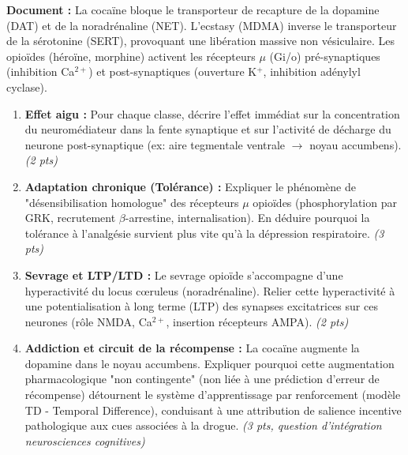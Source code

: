 \documentclass[11pt]{article}
\begin{document}
\begin{exercice}
\textbf{Document :} La cocaïne bloque le transporteur de recapture de la dopamine (DAT) et de la noradrénaline (NET). L'ecstasy (MDMA) inverse le transporteur de la sérotonine (SERT), provoquant une libération massive non vésiculaire. Les opioïdes (héroïne, morphine) activent les récepteurs $\mu$ (Gi/o) pré-synaptiques (inhibition Ca$^{2+}$) et post-synaptiques (ouverture K$^+$, inhibition adénylyl cyclase).
\begin{enumerate}
\item \textbf{Effet aigu :} Pour chaque classe, décrire l'effet immédiat sur la concentration du neuromédiateur dans la fente synaptique et sur l'activité de décharge du neurone post-synaptique (ex: aire tegmentale ventrale $\rightarrow$ noyau accumbens). \textit{(2 pts)}
\item \textbf{Adaptation chronique (Tolérance) :} Expliquer le phénomène de "désensibilisation homologue" des récepteurs $\mu$ opioïdes (phosphorylation par GRK, recrutement $\beta$-arrestine, internalisation). En déduire pourquoi la tolérance à l'analgésie survient plus vite qu'à la dépression respiratoire. \textit{(3 pts)}
\item \textbf{Sevrage et LTP/LTD :} Le sevrage opioïde s'accompagne d'une hyperactivité du locus cœruleus (noradrénaline). Relier cette hyperactivité à une potentialisation à long terme (LTP) des synapses excitatrices sur ces neurones (rôle NMDA, Ca$^{2+}$, insertion récepteurs AMPA). \textit{(2 pts)}
\item \textbf{Addiction et circuit de la récompense :} La cocaïne augmente la dopamine dans le noyau accumbens. Expliquer pourquoi cette augmentation pharmacologique "non contingente" (non liée à une prédiction d'erreur de récompense) détournent le système d'apprentissage par renforcement (modèle TD - Temporal Difference), conduisant à une attribution de salience incentive pathologique aux cues associées à la drogue. \textit{(3 pts, question d'intégration neurosciences cognitives)}
\end{enumerate}
\end{exercice}
\end{document}
